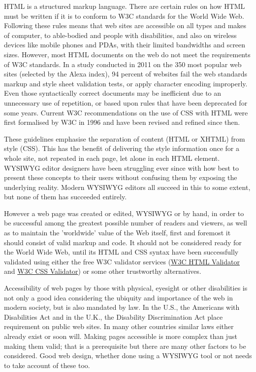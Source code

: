 HTML is a structured markup language. There are certain rules on how HTML must be written if it is to conform to W3C standards for the World Wide Web. Following these rules means that web sites are accessible on all types and makes of computer, to able-bodied and people with disabilities, and also on wireless devices like mobile phones and PDAs, with their limited bandwidths and screen sizes. However, most HTML documents on the web do not meet the requirements of W3C standards. In a study conducted in 2011 on the 350 most popular web sites (selected by the Alexa index), 94 percent of websites fail the web standards markup and style sheet validation tests, or apply character encoding improperly. Even those syntactically correct documents may be inefficient due to an unnecessary use of repetition, or based upon rules that have been deprecated for some years. Current W3C recommendations on the use of CSS with HTML were first formalised by W3C in 1996 and have been revised and refined since then. 


These guidelines emphasise the separation of content (HTML or XHTML) from style (CSS). This has the benefit of delivering the style information once for a whole site, not repeated in each page, let alone in each HTML element. WYSIWYG editor designers have been struggling ever since with how best to present these concepts to their users without confusing them by exposing the underlying reality. Modern WYSIWYG editors all succeed in this to some extent, but none of them has succeeded entirely.

However a web page was created or edited, WYSIWYG or by hand, in order to be successful among the greatest possible number of readers and viewers, as well as to maintain the 'worldwide' value of the Web itself, first and foremost it should consist of valid markup and code. It should not be considered ready for the World Wide Web, until its HTML and CSS syntax have been successfully validated using either the free W3C validator services (\href{http://validator.w3.org/}{W3C HTML Validator} and \href{http://jigsaw.w3.org/css-validator/}{W3C CSS Validator}) or some other trustworthy alternatives.

Accessibility of web pages by those with physical, eyesight or other disabilities is not only a good idea considering the ubiquity and importance of the web in modern society, but is also mandated by law. In the U.S., the Americans with Disabilities Act and in the U.K., the Disability Discrimination Act place requirement on public web sites. In many other countries similar laws either already exist or soon will. Making pages accessible is more complex than just making them valid; that is a prerequisite but there are many other factors to be considered. Good web design, whether done using a WYSIWYG tool or not needs to take account of these too.

